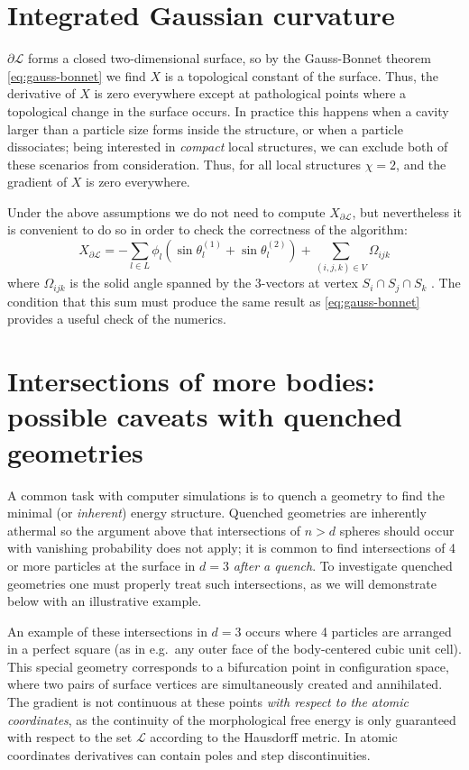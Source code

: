 \documentclass[11pt,twoside]{report}
\begin{document}
\section{Integrated Gaussian curvature}

$\partial\mathcal{L}$ forms a closed two-dimensional surface, so by the Gauss-Bonnet theorem \eqref{eq:gauss-bonnet} we find $X$ is a topological constant of the surface.
Thus, the derivative of $X$ is zero everywhere except at pathological points where a topological change in the surface occurs.
In practice this happens when a cavity larger than a particle size forms inside the structure, or when a particle dissociates; being interested in \emph{compact} local structures, we can exclude both of these scenarios from consideration.
Thus, for all local structures $\chi=2$, and the gradient of $X$ is zero everywhere.

Under the above assumptions we do not need to compute $X_{\partial\mathcal{L}}$, but nevertheless it is convenient to do so in order to check the correctness of the algorithm:
\begin{equation}
  X_{\partial\mathcal{L}} =
  -\sum_{l \in L} \phi_l (\sin{\theta_l^{(1)}} + \sin{\theta_l^{(2)}}) +
  \sum_{(i,j,k) \in V} \Omega_{ijk}
\end{equation}
where $\Omega_{ijk}$ is the solid angle spanned by the 3-vectors at vertex $S_i \cap S_j \cap S_k$ \cite{MeckeAA1994}.
The condition that this sum must produce the same result as \eqref{eq:gauss-bonnet} provides a useful check of the numerics.

\section{Intersections of more bodies: possible caveats with quenched geometries}
\label{sec:higher-order-intersections}

A common task with computer simulations is to quench a geometry to find the minimal (or \emph{inherent}) energy structure.
Quenched geometries are inherently athermal so the argument above that intersections of $n>d$ spheres should occur with vanishing probability does not apply; it is common to find intersections of 4 or more particles at the surface in $d=3$ \emph{after a quench}.
To investigate quenched geometries one must properly treat such intersections, as we will demonstrate below with an illustrative example.

An example of these intersections in $d=3$ occurs where 4 particles are arranged in a perfect square (as in e.g.\ any outer face of the body-centered cubic unit cell).
This special geometry corresponds to a bifurcation point in configuration space, where two pairs of surface vertices are simultaneously created and annihilated.
The gradient is not continuous at these points \emph{with respect to the atomic coordinates}, as the continuity of the morphological free energy is only guaranteed with respect to the set $\mathcal{L}$ according to the Hausdorff metric.
In atomic coordinates derivatives can contain poles and step discontinuities.
\end{document}

